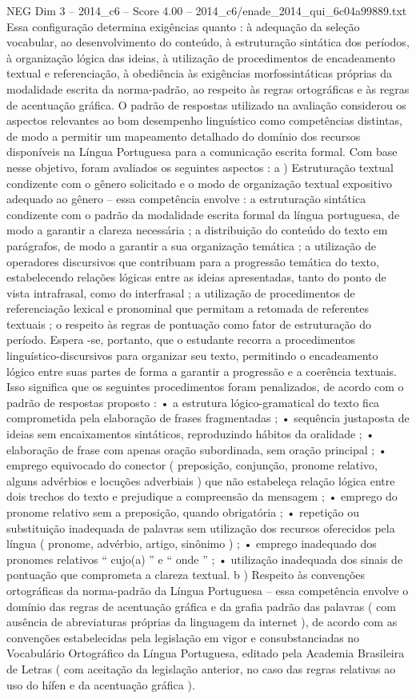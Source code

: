 \begin{textsample}{NEG Dim 3 – 2014\_c6 – Score 4.00 – 2014\_c6/enade\_2014\_qui\_6c04a99889.txt}
Essa configuração determina exigências quanto : à adequação da seleção vocabular, ao desenvolvimento do conteúdo, à estruturação sintática dos períodos, à organização lógica das ideias, à utilização de procedimentos de encadeamento textual e referenciação, à obediência às exigências morfossintáticas próprias da modalidade escrita da norma-padrão, ao respeito às regras ortográficas e às regras de acentuação gráfica.
O padrão de respostas utilizado na avaliação considerou os aspectos relevantes ao bom desempenho linguístico como competências distintas, de modo a permitir um mapeamento detalhado do domínio dos recursos disponíveis na Língua Portuguesa para a comunicação escrita formal.
Com base nesse objetivo, foram avaliados os seguintes aspectos : a ) Estruturação textual condizente com o gênero solicitado e o modo de organização textual expositivo adequado ao gênero – essa competência envolve : a estruturação sintática condizente com o padrão da modalidade escrita formal da língua portuguesa, de modo a garantir a clareza necessária ; a distribuição do conteúdo do texto em parágrafos, de modo a garantir a sua organização temática ; a utilização de operadores discursivos que contribuam para a progressão temática do texto, estabelecendo relações lógicas entre as ideias apresentadas, tanto do ponto de vista intrafrasal, como do interfrasal ; a utilização de procedimentos de referenciação lexical e pronominal que permitam a retomada de referentes textuais ; o respeito às regras de pontuação como fator de estruturação do período.
Espera -se, portanto, que o estudante recorra a procedimentos linguístico-discursivos para organizar seu texto, permitindo o encadeamento lógico entre suas partes de forma a garantir a progressão e a coerência textuais.
Isso significa que os seguintes procedimentos foram penalizados, de acordo com o padrão de respostas proposto : • a estrutura lógico-gramatical do texto fica comprometida pela elaboração de frases fragmentadas ; • sequência justaposta de ideias sem encaixamentos sintáticos, reproduzindo hábitos da oralidade ; • elaboração de frase com apenas oração subordinada, sem oração principal ; • emprego equivocado do conector ( preposição, conjunção, pronome relativo, alguns advérbios e locuções adverbiais ) que não estabeleça relação lógica entre dois trechos do texto e prejudique a compreensão da mensagem ; • emprego do pronome relativo sem a preposição, quando obrigatória ; • repetição ou substituição inadequada de palavras sem utilização dos recursos oferecidos pela língua ( pronome, advérbio, artigo, sinônimo ) ; • emprego inadequado dos pronomes relativos “ cujo(a) ” e “ onde ” ; • utilização inadequada dos sinais de pontuação que comprometa a clareza textual. b ) Respeito às convenções ortográficas da norma-padrão da Língua Portuguesa – essa competência envolve o domínio das regras de acentuação gráfica e da grafia padrão das palavras ( com ausência de abreviaturas próprias da linguagem da internet ), de acordo com as convenções estabelecidas pela legislação em vigor e consubstanciadas no Vocabulário Ortográfico da Língua Portuguesa, editado pela Academia Brasileira de Letras ( com aceitação da legislação anterior, no caso das regras relativas ao uso do hífen e da acentuação gráfica ).

\end{textsample}
